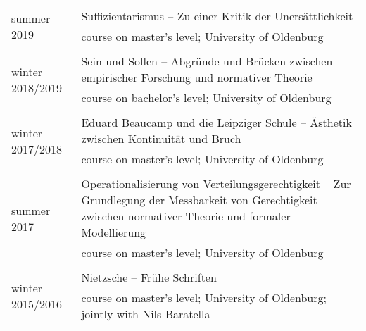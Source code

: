 \documentclass[a4paper,10pt]{article}
\begin{document}
\begin{longtable}{p{}p{11cm}}
\\
\multirow{2}{2,25cm}{\footnotesize{summer 2019}} & Suffizientarismus -- Zu einer Kritik der Unersättlichkeit\\
& \footnotesize{course on master's level; University of Oldenburg}\\
\\
\multirow{2}{2,25cm}{\footnotesize{winter 2018/2019}} & Sein und Sollen -- Abgründe und Brücken zwischen empirischer Forschung und normativer Theorie\\
& \footnotesize{course on bachelor's level; University of Oldenburg}\\
\\
\multirow{2}{2,25cm}{\footnotesize{winter 2017/2018}} & Eduard Beaucamp und die Leipziger Schule -- Ästhetik zwischen Kontinuität und Bruch\\
& \footnotesize{course on master's level; University of Oldenburg}\\
\\
\multirow{2}{2,25cm}{\footnotesize{summer 2017}} & Operationalisierung von Verteilungsgerechtigkeit -- Zur Grundlegung der Messbarkeit von Gerechtigkeit zwischen normativer Theorie und formaler Modellierung\\
& \footnotesize{course on master's level; University of Oldenburg}\\
\\
\multirow{2}{2,25cm}{\footnotesize{winter 2015/2016}} & Nietzsche -- Frühe Schriften\\
& \footnotesize{course on master's level; University of Oldenburg; jointly with Nils Baratella}\\
\end{longtable}
\end{document}

